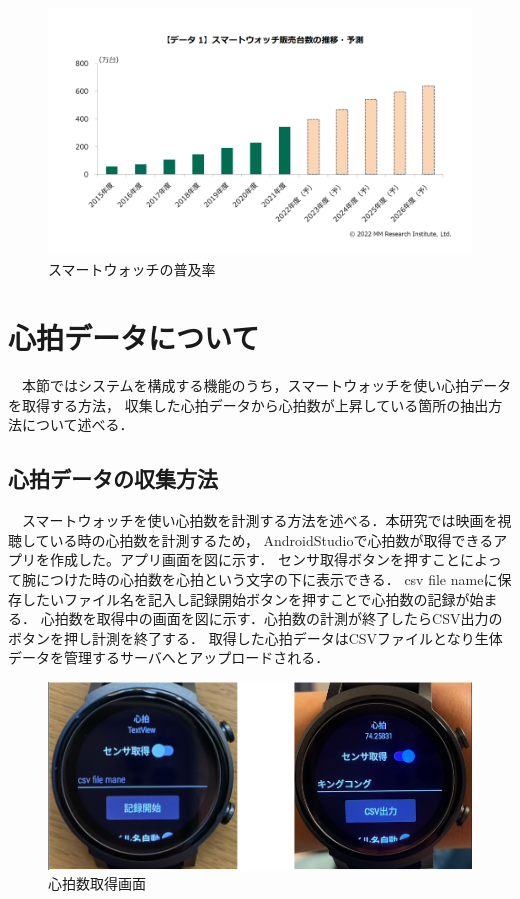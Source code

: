 \begin{figure}[H]
    \centering
    \includegraphics[width=14cm]{images/chapter3/watchreserch.png}
    \caption{スマートウォッチの普及率}
\end{figure}

\section{心拍データについて}

　本節ではシステムを構成する機能のうち，スマートウォッチを使い心拍データを取得する方法，
収集した心拍データから心拍数が上昇している箇所の抽出方法について述べる．

\subsection{心拍データの収集方法}

　スマートウォッチを使い心拍数を計測する方法を述べる．本研究では映画を視聴している時の心拍数を計測するため，
AndroidStudioで心拍数が取得できるアプリを作成した。アプリ画面を図に示す．
センサ取得ボタンを押すことによって腕につけた時の心拍数を心拍という文字の下に表示できる．
csv file nameに保存したいファイル名を記入し記録開始ボタンを押すことで心拍数の記録が始まる．
心拍数を取得中の画面を図に示す．心拍数の計測が終了したらCSV出力のボタンを押し計測を終了する．
取得した心拍データはCSVファイルとなり生体データを管理するサーバへとアップロードされる．

\begin{figure}[tbh]
    \centering
    \includegraphics[width=15cm]{images/chapter3/watchgazou.png}
    \caption{心拍数取得画面}
\end{figure}


